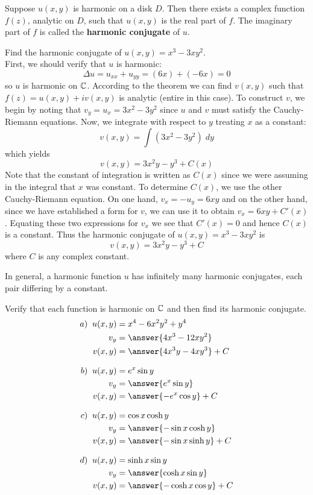 \documentclass[handout]{ximera}
\begin{document}
  
\begin{theorem}
Suppose $u(x,y)$ is harmonic on a disk $D$.  Then there exists a complex function $f(z)$, analytic on $D$, 
such that $u(x,y)$ is the real part of $f$. The imaginary part of $f$ is called the {\bf harmonic conjugate} of $u$.
\end{theorem}


\begin{example}
Find the harmonic conjugate of $u(x,y) = x^3 - 3xy^2$.\\
First, we should verify that $u$ is harmonic:
\[
\Delta u = u_{xx} + u_{yy} = (6x) + (-6x) = 0
\]
so $u$ is harmonic on $\mathbb C$. According to the theorem we can find $v(x,y)$ such that
$f(z) = u(x,y) + iv(x,y)$ is analytic (entire in this case). To construct $v$, we begin by noting that
$v_y = u_x = 3x^2 - 3y^2$ since $u$ and $v$ must satisfy the Cauchy-Riemann equations.
Now, we integrate with respect to $y$ treating $x$ as a constant:
\[
v(x,y) = \int \left(3x^2 -3y^2\right) \; dy
\]
which yields
\[
v(x,y) = 3x^2y - y^3 + C(x)
\]
Note that the constant of integration is written as $C(x)$ since we were assuming in 
the integral that $x$ was constant. To determine $C(x)$, we use the other Cauchy-Riemann equation. 
On one hand, $v_x = -u_y = 6xy$ and on the other hand, since we have established a form for $v$, we can use it
to obtain $v_x = 6xy + C'(x)$. Equating these two expressions for $v_x$ we see 
that $C'(x) =0$ and hence $C(x)$ is a constant. Thus the harmonic conjugate of $u(x,y) = x^3 - 3xy^2$ is
\[
v(x,y) = 3x^2y - y^3 + C
\]
where $C$ is any complex constant.
\end{example}

\begin{remark}
In general, a harmonic function $u$ has infinitely many harmonic conjugates, each pair differing by a constant.
\end{remark}

\begin{problem}
Verify that each function is harmonic on $\mathbb C$ and then find its harmonic conjugate.
\begin{align*}
a) \;\;u(x,y) &= x^4 -6x^2y^2 + y^4\\
v_y &= \answer{4x^3 - 12xy^2}\\
v(x,y) &= \answer{4x^3y - 4xy^3}+C\\[8pt]
b) \;\;u(x,y) &= e^x\sin y\\
v_y &= \answer{e^x \sin y}\\
v(x,y) &= \answer{-e^x \cos y}+C\\[8pt]
c) \;\;u(x,y) &= \cos x \cosh y\\
v_y &= \answer{-\sin x \cosh y}\\
v(x,y) &= \answer{-\sin x \sinh y}+C\\[8pt]
d) \;\; u(x,y) &= \sinh x \sin y\\
v_y &= \answer{\cosh x \sin y}\\
v(x,y) &= \answer{-\cosh x \cos y}+C
\end{align*}
\end{problem}
\end{document}
